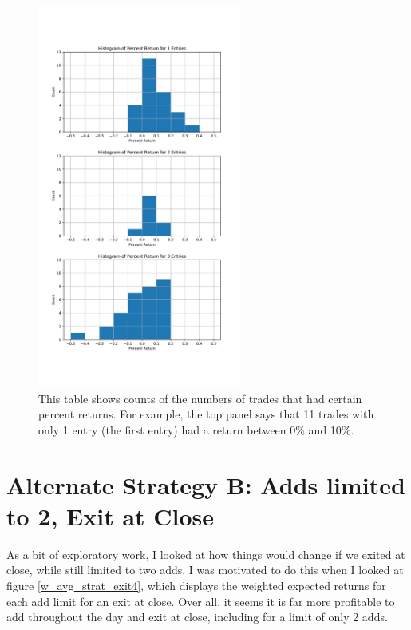 \documentclass{article}
\begin{document}
	\begin{figure}
	
	\includegraphics[width=0.6\textwidth]{prog_entry_lim3_hist_by_entry.pdf}
	\caption{This table shows counts of the numbers of trades that had certain percent returns. For example, the top panel says that 11 trades with only 1 entry (the first entry) had a return between 0\% and 10\%.}
	\label{hist_by_entry_strat_lim3}
	\end{figure}
	

\pagebreak

\section{Alternate Strategy B: Adds limited to 2, Exit at Close}

As a bit of exploratory work, I looked at how things would change if we exited at close, while still limited to two adds. I was motivated to do this when I looked at figure \ref{w_avg_strat_exit4}, which displays the weighted expected returns for each add limit for an exit at close. Over all, it seems it is far more profitable to add throughout the day and exit at close, including for a limit of only 2 adds. 
\end{document}
